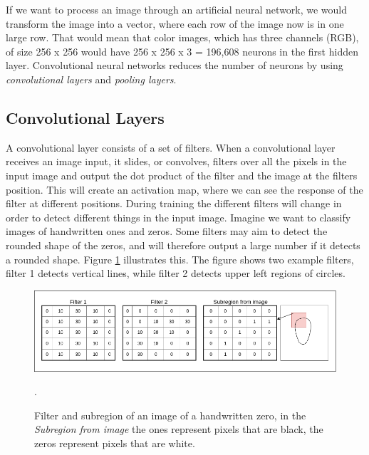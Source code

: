 \vspace{2mm}

If we want to process an image through an artificial neural network, we would transform the image into a vector, where each row of the image now is in one large row. That would mean that color images, which has three channels (RGB), of size 256 x 256 would have 256 x 256 x 3 = 196,608 neurons in the first hidden layer. Convolutional neural networks reduces the number of neurons by using \textit{convolutional layers} and \textit{pooling layers}.

\subsection{Convolutional Layers}
\label{sec:conv}
 A convolutional layer consists of a set of filters. When a convolutional layer receives an image input, it slides, or convolves, filters over all the pixels in the input image and output the dot product of the filter and the image at the filters position. This will create an activation map, where we can see the response of the filter at different positions. During training the different filters will change in order to detect different things in the input image. Imagine we want to classify images of handwritten ones and zeros. Some filters may aim to detect the rounded shape of the zeros, and will therefore output a large number if it detects a rounded shape. Figure \ref{fig:filter_cnn} illustrates this. The figure shows two example filters, filter 1 detects vertical lines, while filter 2 detects upper left regions of circles. 

\begin{figure}[h!]
    \centering
    \includegraphics[scale=0.40]{fig/Filter_cnn.png}
    \caption{Filter and subregion of an image of a handwritten zero, in the \textit{Subregion from image} the ones represent pixels that are black, the zeros represent pixels that are white.}
    \label{fig:filter_cnn}.
\end{figure}

\newpage

